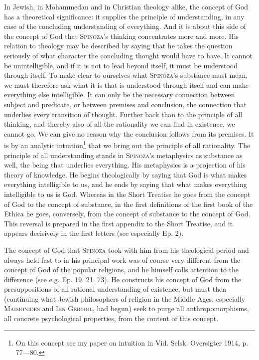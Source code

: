 \documentclass[12pt]{article}
\begin{document}
In Jewish, in Mohammedan and in Christian theology alike, the concept of God has a
theoretical significance: it supplies the principle of understanding, in any case
of the concluding understanding of everything. And it is about this side of the
concept of God that \textsc{Spinoza}'s thinking concentrates more and more. His
relation to theology may be described by saying that he takes the question
seriously of what character the concluding thought would have to have. It cannot
be unintelligible, and if it is not to lead beyond itself, it must be understood
through itself. To make clear to ourselves what \textsc{Spinoza}'s substance must
mean, we must therefore ask what it is that is understood through itself and can
make everything else intelligible. It can only be the necessary connection between
subject and predicate, or between premises and conclusion, the connection that
underlies every transition of thought. Further back than to the principle of all
thinking, and thereby also of all the rationality we can find in existence, we
cannot go. We can give no reason why the conclusion follows from its premises. It
is by an analytic intuition\footnote{On this concept see my paper on intuition in
Vid. Selsk. Oversigter 1914, p. 77---80.} that we bring out the principle of all
rationality. The principle of all understanding stands in \textsc{Spinoza}'s
metaphysics as substance as well, the being that underlies everything. His
metaphysics is a projection of his theory of knowledge. He begins theologically by
saying that God is what makes everything intelligible to us, and he ends by saying
that what makes everything intelligible to us is God. Whereas in the Short Treatise
he goes from the concept of God to the concept of substance, in the first
definitions of the first book of the Ethica he goes, conversely, from the concept
of substance to the concept of God. This reversal is prepared in the first
appendix to the Short Treatise, and it appears decisively in the first letters
(see especially Ep. 2).

The concept of God that \textsc{Spinoza} took with him from his theological period
and always held fast to in his principal work was of course very different from
the concept of God of the popular religions, and he himself calls attention to
the difference (see e.g. Ep. 19. 21. 73). He constructs his concept of God from
the presuppositions of all rational understanding of existence, but must then
(continuing what Jewish philosophers of religion in the Middle Ages, especially
\textsc{Maimonides} and \textsc{Ibn Gebirol}, had begun) seek to purge all
anthropomorphisms, all concrete psychological properties, from the content of
this concept.
\end{document}
